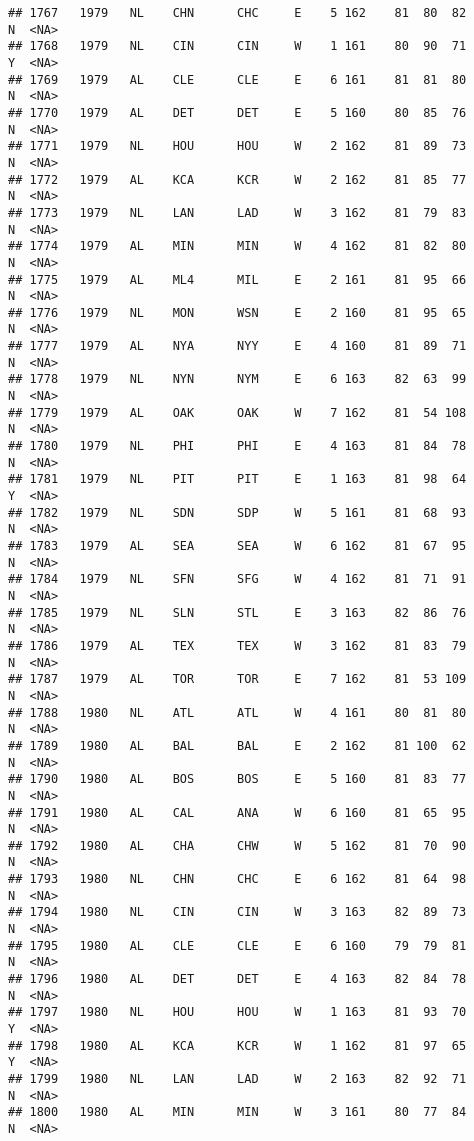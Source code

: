 \documentclass[]{article}
\begin{document}
\begin{verbatim}
## 1767   1979   NL    CHN      CHC     E    5 162    81  80  82      N  <NA>
## 1768   1979   NL    CIN      CIN     W    1 161    80  90  71      Y  <NA>
## 1769   1979   AL    CLE      CLE     E    6 161    81  81  80      N  <NA>
## 1770   1979   AL    DET      DET     E    5 160    80  85  76      N  <NA>
## 1771   1979   NL    HOU      HOU     W    2 162    81  89  73      N  <NA>
## 1772   1979   AL    KCA      KCR     W    2 162    81  85  77      N  <NA>
## 1773   1979   NL    LAN      LAD     W    3 162    81  79  83      N  <NA>
## 1774   1979   AL    MIN      MIN     W    4 162    81  82  80      N  <NA>
## 1775   1979   AL    ML4      MIL     E    2 161    81  95  66      N  <NA>
## 1776   1979   NL    MON      WSN     E    2 160    81  95  65      N  <NA>
## 1777   1979   AL    NYA      NYY     E    4 160    81  89  71      N  <NA>
## 1778   1979   NL    NYN      NYM     E    6 163    82  63  99      N  <NA>
## 1779   1979   AL    OAK      OAK     W    7 162    81  54 108      N  <NA>
## 1780   1979   NL    PHI      PHI     E    4 163    81  84  78      N  <NA>
## 1781   1979   NL    PIT      PIT     E    1 163    81  98  64      Y  <NA>
## 1782   1979   NL    SDN      SDP     W    5 161    81  68  93      N  <NA>
## 1783   1979   AL    SEA      SEA     W    6 162    81  67  95      N  <NA>
## 1784   1979   NL    SFN      SFG     W    4 162    81  71  91      N  <NA>
## 1785   1979   NL    SLN      STL     E    3 163    82  86  76      N  <NA>
## 1786   1979   AL    TEX      TEX     W    3 162    81  83  79      N  <NA>
## 1787   1979   AL    TOR      TOR     E    7 162    81  53 109      N  <NA>
## 1788   1980   NL    ATL      ATL     W    4 161    80  81  80      N  <NA>
## 1789   1980   AL    BAL      BAL     E    2 162    81 100  62      N  <NA>
## 1790   1980   AL    BOS      BOS     E    5 160    81  83  77      N  <NA>
## 1791   1980   AL    CAL      ANA     W    6 160    81  65  95      N  <NA>
## 1792   1980   AL    CHA      CHW     W    5 162    81  70  90      N  <NA>
## 1793   1980   NL    CHN      CHC     E    6 162    81  64  98      N  <NA>
## 1794   1980   NL    CIN      CIN     W    3 163    82  89  73      N  <NA>
## 1795   1980   AL    CLE      CLE     E    6 160    79  79  81      N  <NA>
## 1796   1980   AL    DET      DET     E    4 163    82  84  78      N  <NA>
## 1797   1980   NL    HOU      HOU     W    1 163    81  93  70      Y  <NA>
## 1798   1980   AL    KCA      KCR     W    1 162    81  97  65      Y  <NA>
## 1799   1980   NL    LAN      LAD     W    2 163    82  92  71      N  <NA>
## 1800   1980   AL    MIN      MIN     W    3 161    80  77  84      N  <NA>

\end{verbatim}
\end{document}

